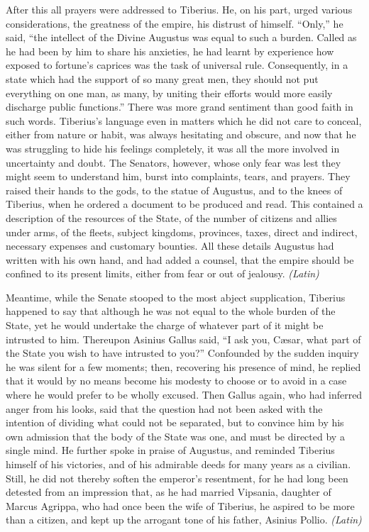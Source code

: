 
After this all prayers were addressed to Tiberius. He, on his part, urged various considerations, the greatness of the empire, his distrust of himself. ``Only,'' he said, ``the intellect of the Divine Augustus was equal to such a burden. Called as he had been by him to share his anxieties, he had learnt by experience how exposed to fortune's caprices was the task of universal rule. Consequently, in a state which had the support of so many great men, they should not put everything on one man, as many, by uniting their efforts would more easily discharge public functions.'' There was more grand sentiment than good faith in such words. Tiberius's language even in matters which he did not care to conceal, either from nature or habit, was always hesitating and obscure, and now that he was struggling to hide his feelings completely, it was all the more involved in uncertainty and doubt. The Senators, however, whose only fear was lest they might seem to understand him, burst into complaints, tears, and prayers. They raised their hands to the gods, to the statue of Augustus, and to the knees of Tiberius, when he ordered a document to be produced and read. This contained a description of the resources of the State, of the number of citizens and allies under arms, of the fleets, subject kingdoms, provinces, taxes, direct and indirect, necessary expenses and customary bounties. All these details Augustus had written with his own hand, and had added a counsel, that the empire should be confined to its present limits, either from fear or out of jealousy. \emph{(Latin)}


Meantime, while the Senate stooped to the most abject supplication, Tiberius happened to say that although he was not equal to the whole burden of the State, yet he would undertake the charge of whatever part of it might be intrusted to him. Thereupon Asinius Gallus said, ``I ask you, Cæsar, what part of the State you wish to have intrusted to you?'' Confounded by the sudden inquiry he was silent for a few moments; then, recovering his presence of mind, he replied that it would by no means become his modesty to choose or to avoid in a case where he would prefer to be wholly excused. Then Gallus again, who had inferred anger from his looks, said that the question had not been asked with the intention of dividing what could not be separated, but to convince him by his own admission that the body of the State was one, and must be directed by a single mind. He further spoke in praise of Augustus, and reminded Tiberius himself of his victories, and of his admirable deeds for many years as a civilian. Still, he did not thereby soften the emperor's resentment, for he had long been detested from an impression that, as he had married Vipsania, daughter of Marcus Agrippa, who had once been the wife of Tiberius, he aspired to be more than a citizen, and kept up the arrogant tone of his father, Asinius Pollio. \emph{(Latin)}

